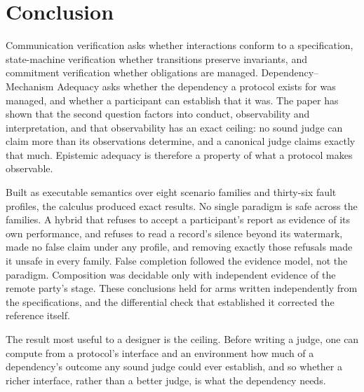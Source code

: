 \section{Conclusion}
\label{sec:conclusion}

Communication verification asks whether interactions conform to a specification, state-machine verification whether transitions preserve invariants, and commitment verification whether obligations are managed. Dependency--Mechanism Adequacy asks whether the dependency a protocol exists for was managed, and whether a participant can establish that it was. The paper has shown that the second question factors into conduct, observability and interpretation, and that observability has an exact ceiling: no sound judge can claim more than its observations determine, and a canonical judge claims exactly that much. Epistemic adequacy is therefore a property of what a protocol makes observable.

Built as executable semantics over eight scenario families and thirty-six fault profiles, the calculus produced exact results. No single paradigm is safe across the families. A hybrid that refuses to accept a participant's report as evidence of its own performance, and refuses to read a record's silence beyond its watermark, made no false claim under any profile, and removing exactly those refusals made it unsafe in every family. False completion followed the evidence model, not the paradigm. Composition was decidable only with independent evidence of the remote party's stage. These conclusions held for arms written independently from the specifications, and the differential check that established it corrected the reference itself.

The result most useful to a designer is the ceiling. Before writing a judge, one can compute from a protocol's interface and an environment how much of a dependency's outcome any sound judge could ever establish, and so whether a richer interface, rather than a better judge, is what the dependency needs.
